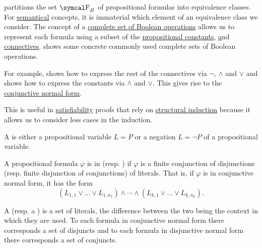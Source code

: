 \begin{remark}\label{remark:minimal_propositional_language}
   partitions the set \( \CF_B \) of propositional formulas into equivalence classes. For \hyperref[remark:syntax_vs_semantics]{semantical} concepts, it is immaterial which element of an equivalence class we consider. The concept of a \hyperref[def:boolean_closure]{complete set of Boolean operations} allows us to represent each formula using a subset of the \hyperref[def:propositional_alphabet/constants]{propositional constants}, \hyperref[def:propositional_alphabet/negation] and \hyperref[def:propositional_alphabet/connectives]{connectives}.  shows some concrete commonly used complete sets of Boolean operations.

  For example,  shows how to express the rest of the connectives via \( \neg \), \( \wedge \) and \( \vee \) and  shows how to express the constants via \( \wedge \) and \( \vee \). This gives rise to the \hyperref[def:conjunctive_disjunctive_normal_form]{conjunctive normal form}.

  This is useful in \hyperref[def:propositional_interpretation/satisfiability]{satisfiability} proofs that rely on \hyperref[remark:induction]{structural induction} because it allows us to consider less cases in the induction.
\end{remark}

\begin{definition}\label{def:conjunctive_disjunctive_normal_form}\mbox{}
  \begin{DefEnum}
     A  is either a propositional variable \( L = P \) or a negation \( L = \neg P \) of a propositional variable.

     A propositional formula \( \varphi \) is in  (resp. ) if \( \varphi \) is a finite conjunction of disjunctions (resp. finite disjunction of conjunctions) of literals. That is, if \( \varphi \) is in conjunctive normal form, it has the form
    \begin{equation*}
      (L_{1,1} \vee \ldots \vee L_{1,n_1}) \wedge \cdots \wedge (L_{k,1} \vee \ldots \vee L_{k,n_k}).
    \end{equation*}

     A  (resp. a ) is a set of literals, the difference between the two being the context in which they are used. To each formula in conjunctive normal form there corresponds a set of disjuncts and to each formula in disjunctive normal form there corresponds a set of conjuncts.
  \end{DefEnum}
\end{definition}

